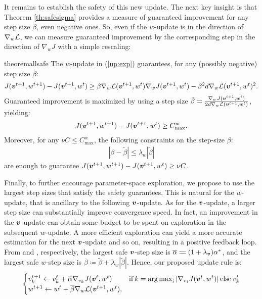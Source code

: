 It remains to establish the safety of this new update. 
The next key insight is that Theorem \ref{th:safesigma} provides a measure of guaranteed improvement for any step size $\beta$, even negative ones. So, even if the $w$-update is in the direction of $\gradDelta$, we can measure guaranteed improvement by the corresponding step in the direction of $\nabla_{w}J$ with a simple rescaling:
\begin{restatable}[]{theorem}{allsafe}\label{th:safe_exp}
	The $w$-update in (\ref{up:exp}) guarantees, for any (possibly negative) step size $\beta$:
	\begin{align*}
	J(\vv^{t+1},w^{t+1}) - J(\vv^{t+1},w^t) \geq \beta\gradDelta(\vv^{t+1},w^t)\gradJ[w]{\vv^{t+1},w^t}-
	\beta^2 d \gradDelta(\vv^{t+1},w^t)^2.
	\end{align*}
	Guaranteed improvement is maximized by using a step size $\tilde{\beta} =\frac{\gradJ[w]{\vv^{t+1},w^t}}{2d\gradDelta(\vv^{t+1},w^t)}$, yielding:
	\begin{align*}
	J(\vv^{t+1},w^{t+1}) - J(\vv^{t+1}, w^t) \geq C_{\text{max}}^w. 
	\end{align*}
	Moreover, for any $\nu C\leq C_{\text{max}}^{w}$, the following constraints on the step-size $\beta$:
	\begin{align}\label{stat:4_3}
	|\beta - \tilde{\beta}| \leq \lambda_{w}|\tilde{\beta}|
	\end{align}
	are enough to guarantee $J(\vv^{t+1},w^{t+1}) - J(\vv^{t+1},w^t)\geq \nu C$.
\end{restatable}
%
Finally, to further encourage parameter-space exploration, we propose to use the largest step sizes that satisfy the safety guarantees. This is natural for the $w$-update, that is ancillary to the following $\vv$-update. As for the $\vv$-update, a larger step size can substantially improve convergence speed. In fact, an improvement in the $\vv$-update can obtain some budget to be spent on exploration in the subsequent $w$-update. A more efficient exploration can yield a more accurate estimation for the next $\vv$-update and so on, resulting in a positive feedback loop. \\
From  and , respectively, the largest safe $\vv$-step size is $\overline{\alpha}\coloneqq(1+\lambda_{\vv})\alpha^*$, and the largest safe $w$-step size is $\overline{\beta}\coloneqq\tilde{\beta} + \lambda_{w}|\tilde{\beta}|$. Hence, our proposed update rule is:
%
\begin{align}\label{up:morexp}
\begin{cases}
v_{k}^{t+1} \gets v_{k}^t + \overline{\alpha}\gradJ[v_{k}]{\vv^t,w^t}
& \text{if}\:k =  \argmax_i |\gradJ[v_i]{\vv^t, w^t}| \:\text{else}\:v_{k}^t\\
w^{t+1} \gets w^t + \overline{\beta}\gradDelta(\vv^{t+1}, w^t),
\end{cases}
\end{align}

